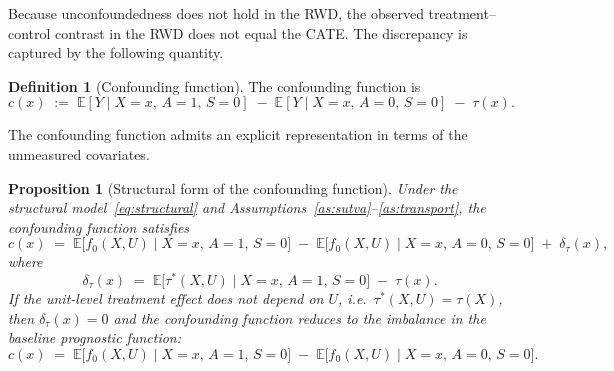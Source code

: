\documentclass[11pt]{article}
\theoremstyle{plain}
\theoremstyle{definition}
\newtheorem{definition}[theorem]{Definition}
\theoremstyle{remark}
\newcommand{\E}{\mathbb{E}}
\newcommand{\1}{\mathds{1}}
\theoremstyle{plain}
\newtheorem{proposition}{Proposition}
\theoremstyle{remark}
\newcommand{\CATE}{\tau}
\newcommand{\cf}{c}
\begin{document}
Because unconfoundedness does not hold in the RWD, the observed treatment--control contrast in the RWD does not equal the CATE. The discrepancy is captured by the following quantity.

\begin{definition}[Confounding function]\label{def:cf}
  The confounding function is
  \begin{equation}\label{eq:cf}
    \cf(x) \;:=\; \E[Y \mid X = x,\, A = 1,\, S = 0]
    \;-\; \E[Y \mid X = x,\, A = 0,\, S = 0]
    \;-\; \CATE(x).
  \end{equation}
\end{definition}

\noindent The confounding function admits an explicit representation in terms of the unmeasured covariates.

\begin{proposition}[Structural form of the confounding function]\label{prop:cf_structural}
  Under the structural model~\eqref{eq:structural} and Assumptions~\ref{as:sutva}--\ref{as:transport}, the confounding function satisfies
  \begin{equation}\label{eq:cf_structural}
    \cf(x) \;=\; \E\bigl[f_0(X,U) \mid X = x,\, A=1,\, S=0\bigr]
    \;-\; \E\bigl[f_0(X,U) \mid X = x,\, A=0,\, S=0\bigr]
    \;+\; \delta_\tau(x),
  \end{equation}
  where
  \begin{equation}\label{eq:delta_tau}
    \delta_\tau(x) \;=\; \E\bigl[\CATE^*(X,U) \mid X=x,\, A=1,\, S=0\bigr]
    \;-\; \CATE(x).
  \end{equation}
  If the unit-level treatment effect does not depend on $U$, i.e.\ $\CATE^*(X,U) = \CATE(X)$, then $\delta_\tau(x) = 0$ and the confounding function reduces to the imbalance in the baseline prognostic function:
  \begin{equation}\label{eq:cf_simple}
    \cf(x) \;=\; \E\bigl[f_0(X,U) \mid X = x,\, A=1,\, S=0\bigr]
    \;-\; \E\bigl[f_0(X,U) \mid X = x,\, A=0,\, S=0\bigr].
  \end{equation}
\end{proposition}
\end{document}
